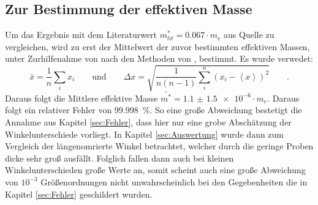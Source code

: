 \subsection{Zur Bestimmung der effektiven Masse}
Um das Ergebnis mit dem Literaturwert $ m_{lit} ^* = 0.067 \cdot m_e$ aus Quelle \cite{effm} zu
vergleichen, wird zu erst der Mittelwert der zuvor bestimmten effektiven Massen, unter Zurhilfenahme
von \cite{numpy} nach den Methoden von \cite{Tipler}, bestimmt. Es wurde verwedet:
\begin{equation*}
\bar{x} = \frac{1}{n} \sum_i x_i \qquad \text{und} \qquad
\Delta x = \sqrt{\frac{1}{n\left(n-1\right)} \sum_i ^n \left( x_i-\left<x\right>\right)^2 } \qquad .
\end{equation*}
Daraus folgt die Mittlere effektive Masse $\bar{m^*} = \SI{1.1(15)e-6} \cdot m_e$. Daraus folgt ein
relativer Fehler von \SI{99.998}{\percent}. So eine große Abweichung bestetigt die Annahme aus
Kapitel \ref{sec:Fehler}, dass hier nur eine grobe Abschätzung der Winkelunterschiede vorliegt.
In Kapitel \ref{sec:Auswertung} wurde dann zum Vergleich der längenomrierte Winkel betrachtet,
welcher durch die geringe Proben dicke sehr groß ausfällt. Folglich fallen dann auch bei kleinen
Winkelunterschieden große Werte an, somit scheint  auch eine große Abweichung von $ 10^{-3}$
Größenordnungen nicht unwahrscheinlich bei den Gegebenheiten die in Kapitel \ref{sec:Fehler}
geschildert wurden.
